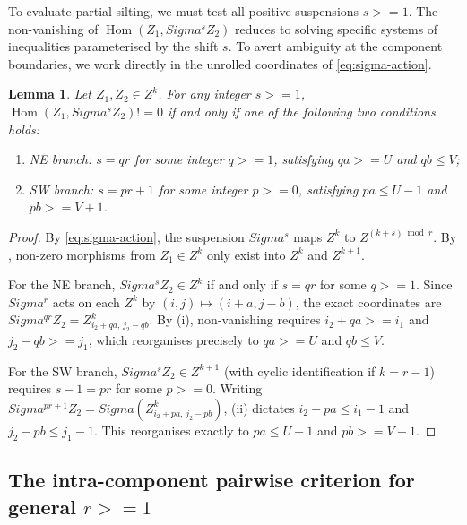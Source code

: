 \documentclass[11pt, a4paper]{article}
\newtheorem{lemma}[theorem]{Lemma}
\theoremstyle{definition}
\def\Sigma{Sigma}%
\def\ge{>=}%
\def\neq{!=}%
\def\mathcal#1{#1}%
\begin{document}
To evaluate partial silting, we must test all positive suspensions $s \ge 1$. The non-vanishing of $\operatorname{Hom}(Z_1, \Sigma^s Z_2)$ reduces to solving specific systems of inequalities parameterised by the shift $s$. To avert ambiguity at the component boundaries, we work directly in the unrolled coordinates of \eqref{eq:sigma-action}.

\begin{lemma}\label{lem:hammock-susp}
Let $Z_1, Z_2 \in \mathcal Z^k$. For any integer $s \ge 1$, $\operatorname{Hom}(Z_1, \Sigma^s Z_2) \neq 0$ if and only if one of the following two conditions holds:
\begin{enumerate}[label=\textup{(\roman*)}]
  \item \emph{NE branch:} $s = q r$ for some integer $q \ge 1$, satisfying $q a \ge U$ and $q b \le V$;
  \item \emph{SW branch:} $s = p r + 1$ for some integer $p \ge 0$, satisfying $p a \le U - 1$ and $p b \ge V + 1$.
\end{enumerate}
\end{lemma}
\begin{proof}
By \eqref{eq:sigma-action}, the suspension $\Sigma^s$ maps $\mathcal Z^k$ to $\mathcal Z^{(k+s)\bmod r}$. By , non-zero morphisms from $Z_1 \in \mathcal Z^k$ only exist into $\mathcal Z^k$ and $\mathcal Z^{k+1}$.

For the NE branch, $\Sigma^s Z_2 \in \mathcal Z^k$ if and only if $s = qr$ for some $q \ge 1$. Since $\Sigma^r$ acts on each $\mathcal Z^k$ by $(i,j)\mapsto(i+a,j-b)$, the exact coordinates are $\Sigma^{qr} Z_2 = Z_{i_2 + qa,\, j_2 - qb}^k$. By (i), non-vanishing requires $i_2 + qa \ge i_1$ and $j_2 - qb \ge j_1$, which reorganises precisely to $q a \ge U$ and $q b \le V$.

For the SW branch, $\Sigma^s Z_2 \in \mathcal Z^{k+1}$ (with cyclic identification if $k=r-1$) requires $s - 1 = pr$ for some $p \ge 0$. Writing $\Sigma^{pr+1} Z_2 = \Sigma(Z_{i_2 + pa,\, j_2 - pb}^k)$, (ii) dictates $i_2 + pa \le i_1 - 1$ and $j_2 - pb \le j_1 - 1$. This reorganises exactly to $p a \le U - 1$ and $p b \ge V + 1$.
\end{proof}

\subsection{The intra-component pairwise criterion for general \texorpdfstring{$r \ge 1$}{r >= 1}}\label{subsec:pairwise-intra}
\end{document}
